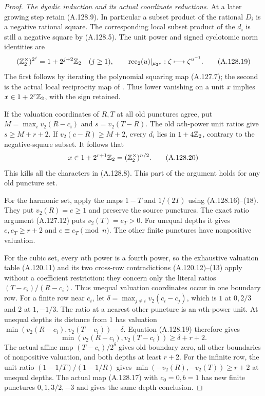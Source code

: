 \begin{proof}
\emph{The dyadic induction and its actual coordinate reductions.}
At a later growing step retain (A.128.9).
In particular a subset product of the rational $D_i$
is a negative rational square.
The corresponding local subset product of the $d_i$
is still a negative square by (A.128.5).
The unit power and signed cyclotomic norm identities are
\[
 (\mathbb Z_2^\times)^{2^j}=1+2^{j+2}\mathbb Z_2\quad(j\ge1),\qquad
 \operatorname{rec}_2(u)|_{\mu_{2^r}}:
                   \zeta\longmapsto\zeta^{u^{-1}}.
\tag{A.128.19}
\]
The first follows by iterating the polynomial squaring
map (A.127.7); the second is the actual local reciprocity
map of \cite[Example 4.1.4]{BIR_KedlayaCFT}.
Thus lower vanishing on a unit $x$ implies
$x\in1+2^r\mathbb Z_2$, with the sign retained.

If the valuation coordinates of $R,T$ at all old punctures
agree, put $M=\max_i v_2(R-c_i)$ and $s=v_2(T-R)$.
The old $n$th-power unit ratios give $s\ge M+r+2$.
If $v_2(c-R)\ge M+2$, every $d_i$ lies in $1+4\mathbb Z_2$,
contrary to the negative-square subset.
It follows that
\[
                    x\in1+2^{r+1}\mathbb Z_2
                              =(\mathbb Z_2^\times)^{n/2}.
\tag{A.128.20}
\]
This kills all the characters in (A.128.8).
This part of the argument holds for any old puncture set.

For the harmonic set, apply the maps $1-T$ and $1/(2T)$
using (A.128.16)--(18).
They put $v_2(R)=e\ge1$ and preserve the source punctures.
The exact ratio argument (A.127.12) puts $v_2(T)=e_T>0$.
For unequal depths it gives
$e,e_T\ge r+2$ and $e\equiv e_T\pmod n$.
The other finite punctures have nonpositive valuation.

For the cubic set, every $n$th power is a fourth power,
so the exhaustive valuation table (A.120.11) and its
two cross-row contradictions (A.120.12)--(13) apply
without a coefficient restriction: they concern only
the literal ratios $(T-c_i)/(R-c_i)$.
Thus unequal valuation coordinates occur in one boundary
row.  For a finite row near $c_i$, let
$\delta=\max_{j\ne i}v_2(c_i-c_j)$, which is $1$
at $0,2/3$ and $2$ at $1,-1/3$.
The ratio at a nearest other puncture is an
$n$th-power unit.  At unequal depths its distance
from $1$ has valuation
$\min(v_2(R-c_i),v_2(T-c_i))-\delta$.
Equation (A.128.19) therefore gives
\[
             \min(v_2(R-c_i),v_2(T-c_i))\ge\delta+r+2.
\tag{A.128.21}
\]
The actual affine map $(T-c_i)/2^\delta$ gives old
boundary zero, all other boundaries of nonpositive
valuation, and both depths at least $r+2$.
For the infinite row, the unit ratio
$(1-1/T)/(1-1/R)$ gives
$\min(-v_2(R),-v_2(T))\ge r+2$ at unequal depths.
The actual map (A.128.17) with $c_0=0,b=1$ has
new finite punctures $0,1,3/2,-3$ and gives the
same depth conclusion.


\end{proof}
